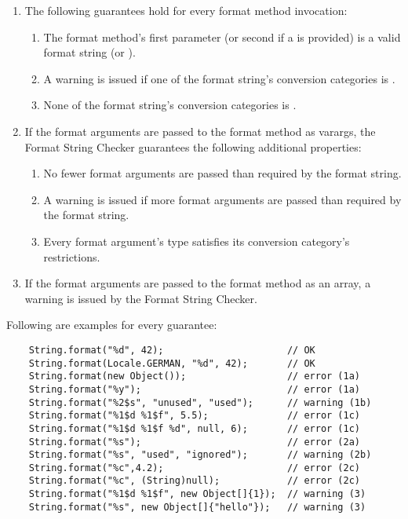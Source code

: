 \begin{enumerate}
\item
The following guarantees hold for every format method invocation:

\begin{enumerate}
    \item The format method's first parameter (or second if a  is provided) is a valid
        format string (or ).

    \item A warning is issued if one of the format string's conversion categories is .
        \label{formatter-unused-category-warning}
    \item None of the format string's conversion categories is .
        \label{formatter-null-category-error}
\end{enumerate}

\item If the format arguments are passed to the format method as varargs, the
Format String Checker guarantees the following additional properties:

\begin{enumerate}
\item No fewer format arguments are passed than required by the format string.
\item A warning is issued if more format arguments are passed than required by the format string.
\item Every format argument's type satisfies its conversion category's restrictions.
\end{enumerate}

\item If the format arguments are passed to the format method as an array,
a warning is issued by the Format String Checker.
        \label{formatter-array-warning}
\end{enumerate}


\noindent Following are examples for every guarantee:

\begin{Verbatim}
    String.format("%d", 42);                      // OK
    String.format(Locale.GERMAN, "%d", 42);       // OK
    String.format(new Object());                  // error (1a)
    String.format("%y");                          // error (1a)
    String.format("%2$s", "unused", "used");      // warning (1b)
    String.format("%1$d %1$f", 5.5);              // error (1c)
    String.format("%1$d %1$f %d", null, 6);       // error (1c)
    String.format("%s");                          // error (2a)
    String.format("%s", "used", "ignored");       // warning (2b)
    String.format("%c",4.2);                      // error (2c)
    String.format("%c", (String)null);            // error (2c)
    String.format("%1$d %1$f", new Object[]{1});  // warning (3)
    String.format("%s", new Object[]{"hello"});   // warning (3)
\end{Verbatim}

